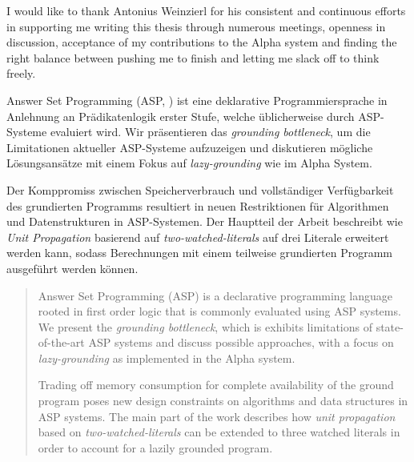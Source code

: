 \documentclass{vutinfth} %
\begin{document}
\frontmatter %

\addstatementpage

\begin{acknowledgements*}
I would like to thank Antonius Weinzierl for his consistent and continuous efforts in supporting me writing this thesis through numerous meetings, openness in discussion, acceptance of my contributions to the Alpha system and finding the right balance between pushing me to finish and letting me slack off to think freely.
\end{acknowledgements*}

\begin{kurzfassung}
Answer Set Programming (ASP, \cite{stable}) ist eine deklarative Programmiersprache in Anlehnung an Prädikatenlogik erster Stufe, welche üblicherweise durch ASP-Systeme evaluiert wird. Wir präsentieren das \emph{grounding bottleneck}, um die Limitationen aktueller ASP-Systeme aufzuzeigen und diskutieren mögliche Lösungsansätze mit einem Fokus auf \emph{lazy-grounding} wie im Alpha System.

Der Komppromiss zwischen Speicherverbrauch und vollständiger Verfügbarkeit des grundierten Programms resultiert in neuen Restriktionen für Algorithmen und Datenstrukturen in ASP-Systemen. Der Hauptteil der Arbeit beschreibt wie \emph{Unit Propagation} basierend auf \emph{two-watched-literals} auf drei Literale erweitert werden kann, sodass Berechnungen mit einem teilweise grundierten Programm ausgeführt werden können.
\end{kurzfassung}

\begin{abstract}
Answer Set Programming (ASP) is a declarative programming language rooted in first order logic that is commonly evaluated using ASP systems. We present the \emph{grounding bottleneck}, which is exhibits limitations of state-of-the-art ASP systems and discuss possible approaches, with a focus on \emph{lazy-grounding} as implemented in the Alpha system.

Trading off memory consumption for complete availability of the ground program poses new design constraints on algorithms and data structures in ASP systems. The main part of the work describes how \emph{unit propagation} based on \emph{two-watched-literals} can be extended to three watched literals in order to account for a lazily grounded program.
\end{abstract}
\end{document}
